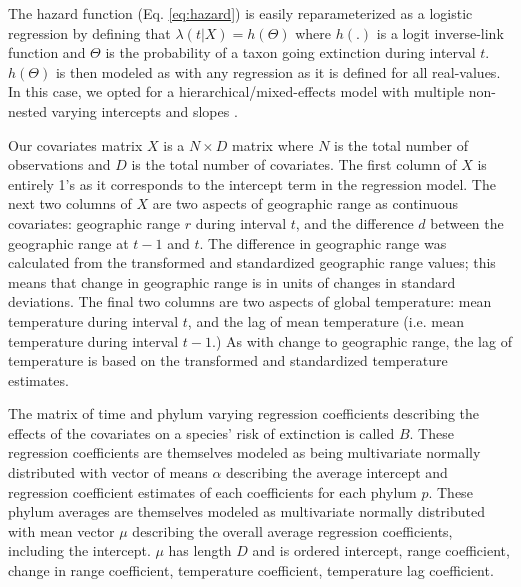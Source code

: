 \documentclass[12pt,letterpaper]{article}
\begin{document}
The hazard function (Eq. \ref{eq:hazard}) is easily reparameterized as a logistic regression by defining that \(\lambda(t | X) = h(\Theta)\) where \(h(.)\) is a logit inverse-link function and \(\Theta\) is the probability of a taxon going extinction during interval \(t\). \(h(\Theta)\) is then modeled as with any regression as it is defined for all real-values. In this case, we opted for a hierarchical/mixed-effects model with multiple non-nested varying intercepts and slopes \citep{ARM}.

Our covariates matrix \(X\) is a \(N \times D\) matrix where \(N\) is the total number of observations and \(D\) is the total number of covariates. The first column of \(X\) is entirely 1's as it corresponds to the intercept term in the regression model. The next two columns of \(X\) are two aspects of geographic range as continuous covariates: geographic range \(r\) during interval \(t\), and the difference \(d\) between the geographic range at \(t - 1\) and \(t\). The difference in geographic range was calculated from the transformed and standardized geographic range values; this means that change in geographic range is in units of changes in standard deviations. The final two columns are two aspects of global temperature: mean temperature during interval \(t\), and the lag of mean temperature (i.e. mean temperature during interval \(t - 1\).) As with change to geographic range, the lag of temperature is based on the transformed and standardized temperature estimates. 

The matrix of time and phylum varying regression coefficients describing the effects of the covariates on a species' risk of extinction is called \(B\). These regression coefficients are themselves modeled as being multivariate normally distributed with vector of means \(\alpha\) describing the average intercept and regression coefficient estimates of each coefficients for each phylum \(p\). These phylum averages are themselves modeled as multivariate normally distributed with mean vector \(\mu\) describing the overall average regression coefficients, including the intercept. \(\mu\) has length \(D\) and is ordered intercept, range coefficient, change in range coefficient, temperature coefficient, temperature lag coefficient.
\end{document}
